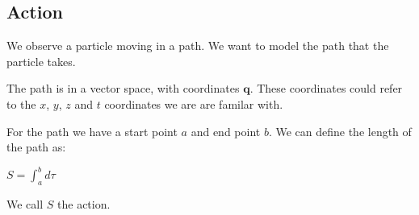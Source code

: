 
\subsection{Action}

We observe a particle moving in a path. We want to model the path that the particle takes.

The path is in a vector space, with coordinates \(\mathbf{q}\). These coordinates could refer to the \(x\), \(y\), \(z\) and \(t\) coordinates we are are familar with.

For the path we have a start point \(a\) and end point \(b\). We can define the length of the path as:

\(S=\int_a^b d\tau \)

We call \(S\) the action.

